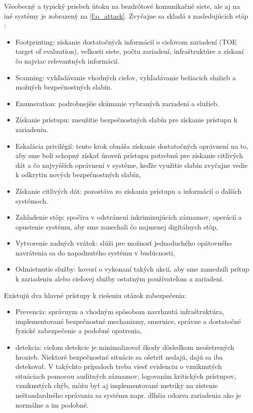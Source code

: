 \documentclass[12pt,a4wide,oneside,openright]{report}
\begin{document}
Všeobecný a typický priebeh útoku na bezdrôtové komunikačné siete, ale aj na iné systémy je zobrazený na \ref{f:o_attack}. Zvyčajne sa skladá z nasledujúcich etáp \cite{bidgoli2006handbook}:

\singlespacing
\begin{itemize}
	\item Footprinting: získanie dostatočných informácií o cieľovom zariadení (TOE target of evaluation), veľkosti siete, počtu zariadení, infraštruktúre a získaní čo najviac relevantných informácií.
	\item Scanning: vyhľadávanie vhodných cieľov, vyhľadávanie bežiacich služieb a možných bezpečnostných slabín.
	\item Enumeration: podrobnejšie skúmanie vybraných zariadení a služieb.
	\item Získanie prístupu: zneužitie bezpečnostných slabín pre získanie prístupu k zariadeniu.
	\item Eskalácia privilégií: tento krok obnáša získanie dostatočných oprávnení na to, aby sme boli schopný získať úroveň prístupu potrebnú pre získanie citlivých dát a čo najvyšších oprávnení v systéme, keďže využitie slabín zvyčajne vedie k odkrytiu nových bezpečnostných slabín,
	\item Získanie citlivých dát: pozostáva zo získania prístupu a informácií o ďalších systémoch.
	\item Zahladenie stôp: spočíva v odstránení inkriminujúcich záznamov, operácií a opustenie systému, aby sme zanechali čo najmenej digitálnych stôp,
	\item Vytvorenie zadných vrátok: slúži pre možnosť jednoduchého opätovného navrátenia sa do napadnutého systému v budúcnosti,
	\item Odmietnutie služby: hovorí o vykonaní takých akcií, aby sme zamedzili prítup k zariadeniu alebo cieľovej služby ostatným používateľom a zariadení.
\end{itemize}

Existujú dva hlavné prístupy k riešeniu otázok zabezpečenia:
\singlespacing
\begin{itemize}
	\item Prevencia: správnym a vhodným spôsobom navrhnutá infraštruktúra, implementované bezpečnostné mechanizmy, smernice, správne a dostatočné fyzické zabezpečenie a podobné opatrenia,
	\item detekcia: cieľom detekcie je minimalizovať škody dôsledkom neošetrených hrozieb. Niektoré bezpečnostné situácie sa ošetriť nedajú, dajú sa iba detekovať. V takýchto prípadoch treba viesť evidenciu o vzniknutých situáciach pomocou auditných záznamov, logovaním kritických prístupov, vzniknutých chýb, môžu byť aj implementované metriky na zistenie neštandardného správania sa systému napr. dlhšia odozva zariadenia ako je normálne a im podobné.
\end{itemize}
\onehalfspacing
\end{document}
